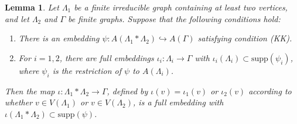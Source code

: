 \documentclass{amsart}
\theoremstyle{definition}
\theoremstyle{plain}
\newtheorem{lemma}[definition]{Lemma}
\numberwithin{equation}{section}
\begin{document}
\begin{lemma}
Let $\Lambda_1$ be a finite irreducible graph containing at least two vertices, and let $\Lambda_2$ and $\Gamma$ be finite graphs. 
Suppose that the following conditions hold: 
\begin{enumerate}
 \item[(1)] There is an embedding $\psi \colon A(\Lambda_1 * \Lambda_2) \hookrightarrow A(\Gamma)$ satisfying condition (KK). 
 \item[(2)] For $i=1,2$, there are full embeddings $\iota_i \colon \Lambda_i \rightarrow \Gamma$ with $\iota_i(\Lambda_i) \subset \mathrm{supp}(\psi_i)$, where $\psi_i$ is the restriction of $\psi$ to $A(\Lambda_i)$. 
\end{enumerate} 
Then the map $\iota \colon \Lambda_1 * \Lambda_2 \rightarrow \Gamma$, defined by $\iota(v) = \iota_1(v)$ or $\iota_2(v)$ according to whether $v \in V(\Lambda_1)$ or $v \in V(\Lambda_2)$, is a full embedding with $\iota(\Lambda_1 * \Lambda_2) \subset  \mathrm{supp}(\psi)$. 
 \label{joining-EGP-pre}
\end{lemma}
\end{document}
